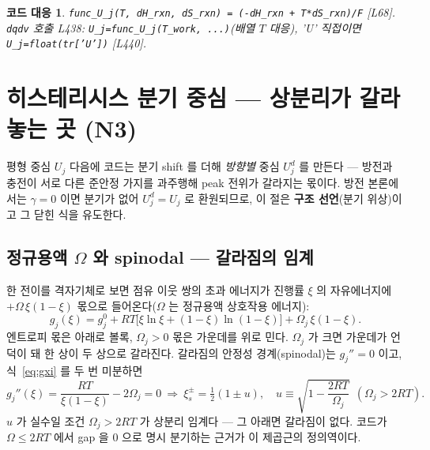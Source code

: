 \documentclass[11pt,a4paper]{article}
\newtheorem*{codebox}{코드 대응}
\begin{document}
\begin{codebox}
\texttt{func\_U\_j(T, dH\_rxn, dS\_rxn) = (-dH\_rxn + T*dS\_rxn)/F} [L68]. \texttt{dqdv} 호출 L438: \texttt{U\_j=func\_U\_j(T\_work, ...)}(배열 $T$ 대응), 'U' 직접이면 \texttt{U\_j=float(tr['U'])} [L440].
\end{codebox}

\section{히스테리시스 분기 중심 — 상분리가 갈라 놓는 곳 (N3)}\label{sec:hys}
평형 중심 $U_j$ 다음에 코드는 분기 shift 를 더해 \emph{방향별} 중심 $U_j^d$ 를 만든다 — 방전과 충전이 서로 다른 준안정 가지를 과주행해 peak 전위가 갈라지는 몫이다. 방전 본론에서는 $\gamma=0$ 이면 분기가 없어 $U_j^d=U_j$ 로 환원되므로, 이 절은 \textbf{구조 선언}(분기 위상)이고 그 닫힌 식을 유도한다.

\subsection{정규용액 $\Omega$ 와 spinodal — 갈라짐의 임계}
한 전이를 격자기체로 보면 점유 이웃 쌍의 초과 에너지가 진행률 $\xi$ 의 자유에너지에 $+\Omega\,\xi(1-\xi)$ 몫으로 들어온다($\Omega$ 는 정규용액 상호작용 에너지):
\begin{equation}
g_j(\xi)=g_j^0+RT\big[\xi\ln\xi+(1-\xi)\ln(1-\xi)\big]+\Omega_j\,\xi(1-\xi).
\label{eq:gxi}
\end{equation}
엔트로피 몫은 아래로 볼록, $\Omega_j>0$ 몫은 가운데를 위로 민다. $\Omega_j$ 가 크면 가운데가 언덕이 돼 한 상이 두 상으로 갈라진다. 갈라짐의 안정성 경계(spinodal)는 $g_j''=0$ 이고, 식~\eqref{eq:gxi} 를 두 번 미분하면
\begin{equation}
g_j''(\xi)=\frac{RT}{\xi(1-\xi)}-2\Omega_j=0
\ \Longrightarrow\
\xi_{s}^\pm=\tfrac12(1\pm u),\quad u\equiv\sqrt{1-\frac{2RT}{\Omega_j}}\ \ (\Omega_j>2RT).
\label{eq:spinodal}
\end{equation}
$u$ 가 실수일 조건 $\Omega_j>2RT$ 가 상분리 임계다 — 그 아래면 갈라짐이 없다. 코드가 $\Omega\le2RT$ 에서 gap 을 $0$ 으로 명시 분기하는 근거가 이 제곱근의 정의역이다.
\end{document}
